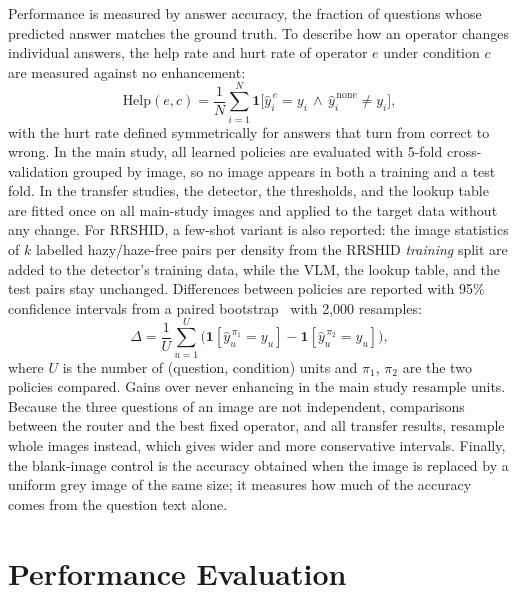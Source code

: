 \documentclass[lettersize,journal]{IEEEtran}
\begin{document}
Performance is measured by answer accuracy, the fraction of questions whose predicted answer matches the ground truth. To describe how an operator changes individual answers, the help rate and hurt rate of operator $e$ under condition $c$ are measured against no enhancement:
\begin{equation}
\text{Help}(e,c) = \frac{1}{N}\sum_{i=1}^{N}\mathbf{1}\big[\hat{y}^{\,e}_{i} = y_i \,\wedge\, \hat{y}^{\,\text{none}}_{i} \neq y_i\big],
\label{eq:help}
\end{equation}
with the hurt rate defined symmetrically for answers that turn from correct to wrong. In the main study, all learned policies are evaluated with 5-fold cross-validation grouped by image, so no image appears in both a training and a test fold. In the transfer studies, the detector, the thresholds, and the lookup table are fitted once on all main-study images and applied to the target data without any change. For RRSHID, a few-shot variant is also reported: the image statistics of $k$ labelled hazy/haze-free pairs per density from the RRSHID \emph{training} split are added to the detector's training data, while the VLM, the lookup table, and the test pairs stay unchanged. Differences between policies are reported with 95\% confidence intervals from a paired bootstrap~\cite{efron1993bootstrap} with 2,000 resamples:
\begin{equation}
\Delta = \frac{1}{U}\sum_{u=1}^{U}\big(\mathbf{1}[\hat{y}^{\,\pi_1}_u = y_u] - \mathbf{1}[\hat{y}^{\,\pi_2}_u = y_u]\big),
\label{eq:delta}
\end{equation}
where $U$ is the number of (question, condition) units and $\pi_1$, $\pi_2$ are the two policies compared. Gains over never enhancing in the main study resample units. Because the three questions of an image are not independent, comparisons between the router and the best fixed operator, and all transfer results, resample whole images instead, which gives wider and more conservative intervals. Finally, the blank-image control is the accuracy obtained when the image is replaced by a uniform grey image of the same size; it measures how much of the accuracy comes from the question text alone.


\section{Performance Evaluation}
\end{document}
